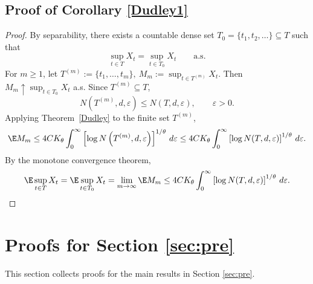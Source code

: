 \documentclass[11pt]{article}
\providecommand{\paren}[1]{\left(#1\right)}
\providecommand{\bracks}[1]{\left[#1\right]}
\begin{document}
\subsection{Proof of Corollary \ref{Dudley1}}\label{se:Dudley1}
\begin{proof}
By separability, there exists a countable dense set $T_0=\{t_1,t_2,\dots\}\subseteq T$ such that
\[
\sup_{t\in T} X_t = \sup_{t\in T_0} X_t
\qquad\text{a.s.}
\]
For $m\ge 1$, let
$T^{(m)}:=\{t_1,\dots,t_m\},~
M_m:=\sup_{t\in T^{(m)}}X_t$. Then $M_m\uparrow \sup_{t\in T_0}X_t$ a.s. Since $T^{(m)}\subseteq T$,
\[
N(T^{(m)},d,\varepsilon)\le N(T,d,\varepsilon),
\qquad \varepsilon>0.
\]
Applying Theorem~\ref{Dudley} to the finite set $T^{(m)}$,
\[
\E M_m
\le
4CK_\theta
\int_0^\infty
\bracks{\log N\paren{T^{(m)},d,\varepsilon}}^{1/\theta}\,d\varepsilon
\le
4CK_\theta
\int_0^\infty
\bracks{\log N(T,d,\varepsilon)}^{1/\theta}\,d\varepsilon.
\]
By the monotone convergence theorem,
\[
\E\sup_{t\in T} X_t
=
\E\sup_{t\in T_0} X_t
=
\lim_{m\to\infty}\E M_m
\le
4CK_\theta
\int_0^\infty
\bracks{\log N(T,d,\varepsilon)}^{1/\theta}\,d\varepsilon.
\]
\end{proof}



\section{Proofs for Section \ref{sec:pre}}\label{proofse3}

This section collects proofs for the main results in Section \ref{sec:pre}.
\end{document}
